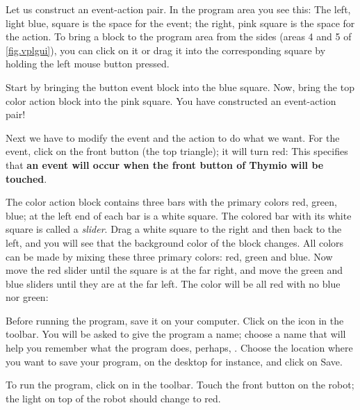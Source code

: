 Let us construct an event-action pair.
In the program area you see this:
The left, light blue, square is the space for the
event; the right, pink square is the space for the action. %
To bring a block to the program area from the sides (areas 4 and 5 of \cref{fig.vplgui}), you can click on it or drag it into the corresponding square by holding the left mouse button pressed.

Start by bringing the button event block  into the blue square.
Now, bring the top color action block  into the pink square.
You have constructed an event-action pair!

Next we have to modify the event and the action to do what we want. For
the event, click on the front button (the top triangle); it will turn
red: 
This specifies that \textbf{an event will occur when the front button of Thymio will be touched}.

The color action block contains three bars with the primary colors red,
green, blue; at the left end of each bar is a white square. The colored
bar with its white square is called a \emph{slider}. Drag a white square
to the right and then back to the left, and you will see that the
background color of the block changes.
All colors can be made by mixing these three primary colors: red, green and blue.
Now move the red slider until the
square is at the far right, and move the green and blue sliders until
they are at the far left. The color will be all red with no blue nor
green: 


Before running the program, save it on your computer.
Click on the icon 
in the toolbar. You will be asked to give the program a name; choose a
name that will help you remember what the program does, perhaps,
.
Choose the location where you want to save your program, on the desktop for instance, and click on Save.


To run the program, click on  in the toolbar. Touch
the front button on the robot; the light on top of the robot should
change to red.


